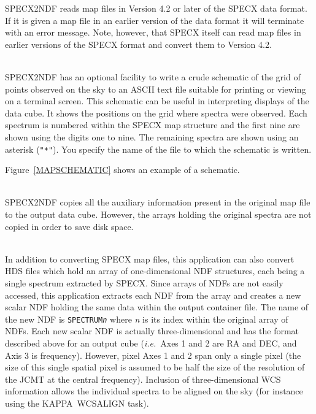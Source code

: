\documentclass[twoside,11pt]{article}
\newcommand{\latex}[1]{#1}
\newcommand{\html}[1]{}
\newcommand{\xref}[3]{#1}
\newcommand{\KAPPA}{{\footnotesize KAPPA}}
\newcommand{\sstdiytopic}[2]{\goodbreak \item[{\hspace{-0.35em}#1\hspace{-0.35em}:}] \mbox{} \\[1.3ex] #2}
\newcommand{\sstdiytopic}[2]{\\ \item[{#1}:]
      \begin{description}
         #2
      \end{description}
   }
\begin{document}
{{      SPECX2NDF reads map files in Version 4.2 or later of the SPECX data 
      format. If it is given a map file in an earlier version of the
      data format it will terminate with an error message.  Note,
      however, that SPECX itself can read map files in earlier versions
      of the SPECX format and convert them to Version 4.2.
   }
   \sstdiytopic{
      Schematic of the map grid   \label{SCHEMATICMAP}
   }{
      SPECX2NDF has an optional facility to write a crude schematic of
      the grid of points observed on the sky to an ASCII text file
      suitable for printing or viewing on a terminal screen.  This
      schematic can be useful in interpreting displays of the data cube.
      It shows the positions on the grid where spectra were observed.
      Each spectrum is numbered within the SPECX map structure and the
      first nine are shown using the digits one to nine.  The remaining
      spectra are shown using an asterisk (\texttt{"*"}).  You specify the name
      of the file to which the schematic is written.
      \html{The figure below}
      \latex{Figure~\ref{MAPSCHEMATIC}} shows an example of a schematic.
   }
   \sstdiytopic{
      Auxiliary information
   }{
      SPECX2NDF copies all the auxiliary information present in the
      original map file to the output data cube.  However, the arrays
      holding the original spectra are not copied in order to save
      disk space.
   }
   \sstdiytopic{
      Input and output spectra formats
   }{
      In addition to converting SPECX map files, this application can also
      convert HDS files which hold an array of one-dimensional NDF structures,
      each being a single spectrum extracted by SPECX.  Since arrays of NDFs
      are not easily accessed, this application extracts each NDF from the
      array and creates a new scalar NDF holding the same data within the
      output container file.  The name of the new NDF is \texttt{SPECTRUM\textit{n}} 
      where \textit{n} is its index within the original array of NDFs. 
      Each new scalar NDF is actually three-dimensional and has the format
      described above for an output cube (\textit{i.e.}\ Axes 1 and 2 are RA and DEC,
      and Axis 3 is frequency).  However, pixel Axes 1 and 2 span only a
      single pixel (the size of this single spatial pixel is assumed to be
      half the size of the resolution of the JCMT at the central frequency).
      Inclusion of three-dimensional WCS information allows the individual
      spectra to be aligned on the sky (for instance using the \KAPPA\ 
      \xref{WCSALIGN}{sun95}{WCSALIGN} task). 
   }
}
\clearpage
\end{document}

